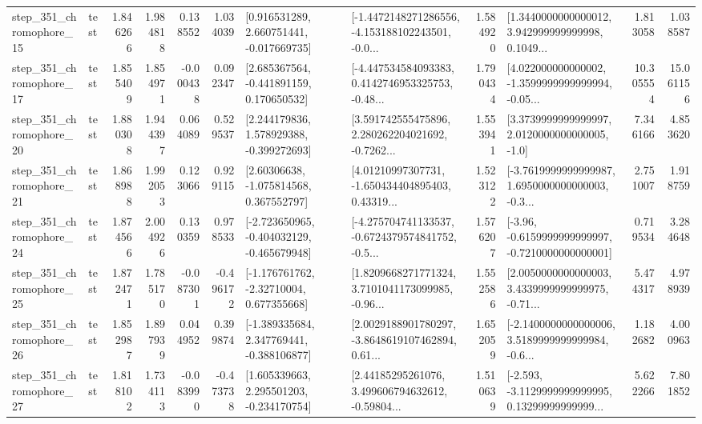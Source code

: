 \begin{tabular}{llrrrrllrlrr}
  step\_351\_chromophore\_15 &      test &      1.846266 &    1.984818 &      0.138552 &  1.034039 &    [0.916531289, 2.660751441, -0.017669735] &  [-1.4472148271286556, -4.153188102243501, -0.0... &       1.584920 &  [1.3440000000000012, 3.942999999999998, 0.1049... &            1.813058 &          1.038587 \\
  step\_351\_chromophore\_17 &      test &      1.855409 &    1.854971 &     -0.000438 &  0.092347 &    [2.685367564, -0.441891159, 0.170650532] &  [-4.447534584093383, 0.4142746953325753, -0.48... &       1.790434 &  [4.022000000000002, -1.3599999999999994, -0.05... &           10.305554 &         15.061156 \\
  step\_351\_chromophore\_20 &      test &      1.880308 &    1.944397 &      0.064089 &  0.529537 &    [2.244179836, 1.578929388, -0.399272693] &  [3.591742555475896, 2.280262204021692, -0.7262... &       1.553941 &     [3.3739999999999997, 2.0120000000000005, -1.0] &            7.346166 &          4.853620 \\
  step\_351\_chromophore\_21 &      test &      1.868988 &    1.992053 &      0.123066 &  0.929115 &     [2.60306638, -1.075814568, 0.367552797] &  [4.01210997307731, -1.650434404895403, 0.43319... &       1.523122 &  [-3.7619999999999987, 1.6950000000000003, -0.3... &            2.751007 &          1.918759 \\
  step\_351\_chromophore\_24 &      test &      1.874566 &    2.004926 &      0.130359 &  0.978533 &  [-2.723650965, -0.404032129, -0.465679948] &  [-4.275704741133537, -0.6724379574841752, -0.5... &       1.576207 &  [-3.96, -0.6159999999999997, -0.7210000000000001] &            0.719534 &          3.284648 \\
  step\_351\_chromophore\_25 &      test &      1.872471 &    1.785170 &     -0.087301 & -0.496172 &    [-1.176761762, -2.32710004, 0.677355668] &  [1.8209668271771324, 3.7101041173099985, -0.96... &       1.552586 &  [2.0050000000000003, 3.4339999999999975, -0.71... &            5.474317 &          4.978939 \\
  step\_351\_chromophore\_26 &      test &      1.852987 &    1.897939 &      0.044952 &  0.399874 &   [-1.389335684, 2.347769441, -0.388106877] &  [2.0029188901780297, -3.8648619107462894, 0.61... &       1.652059 &  [-2.1400000000000006, 3.5189999999999984, -0.6... &            1.182682 &          4.000963 \\
  step\_351\_chromophore\_27 &      test &      1.818102 &    1.734113 &     -0.083990 & -0.473738 &    [1.605339663, 2.295501203, -0.234170754] &  [2.44185295261076, 3.499606794632612, -0.59804... &       1.510639 &  [-2.593, -3.1129999999999995, 0.13299999999999... &            5.622266 &          7.801852 \\

\end{tabular}

